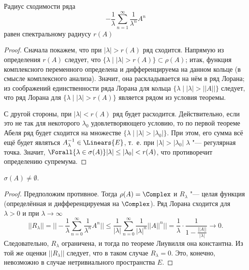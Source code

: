 \documentclass[main]{subfiles}
\begin{document}
\begin{proposition} %
  Радиус сходимости ряда 
  \[
    -\frac1\lambda \sum_{n=1}^\infty \frac1{\lambda^n} A^n
  \]
  равен спектральному радиусу \( r(A) \)
\end{proposition}
\begin{proof}
  Сначала покажем, что при \( |\lambda| > r(A) \)
  ряд сходится.
  Напрямую из определения \( r(A) \)
  следует, что
  \( \{ \lambda \mid |\lambda| > r(A) \} \subset \rho(A) \);
  итак, функция комплексного переменного определена
  и дифференцируема на данном кольце
  (в смысле комплексного анализа).
  Значит, она раскладывается на нём в ряд Лорана;
  из соображений единственности ряда Лорана
  для кольца \( \{ \lambda \mid |\lambda| > ||A|| \} \)
  следует, что ряд Лорана для
  \( \{ \lambda \mid |\lambda| > r(A) \} \)
  является рядом из условия
  теоремы.
 
  С другой стороны, при \( |\lambda| < r(A) \)
  ряд будет расходится.
  Действительно, если это не так для некоторого \( \lambda_0 \)
  удовлетворяющего условию, то
  по первой теореме Абеля
  ряд будет сходится на
  множестве
  \( \{ \lambda \mid |\lambda| > |\lambda_0| \} \).
  При этом, его сумма всё ещё будет
  являться \( A_\lambda^{-1} \in \Linears{E} \),
  т.~е. при \( |\lambda| > |\lambda_0| \)
  \( \lambda \) "--- регулярная точка.
  Значит, \( \Forall{\lambda \in \sigma(A)}
  |\lambda| \le |\lambda_0| < r(A) \),
  что противоречит определению супремума.
\end{proof}

\begin{proposition} %
  \( \sigma(A) \ne \emptyset \).
\end{proposition}
\begin{proof}
  Предположим противное.
  Тогда \( \rho(A) = \Complex \)
  и \( R_\lambda \) "--- целая функция
  (определённая и дифференцируемая на \( \Complex \)).
  Ряд Лорана сходится для \( \lambda > 0 \) и
  при \( \lambda \to \infty \)
  \[
    ||R_\lambda|| =
    ||-\frac{1}{\lambda} \sum_{n=0}^\infty \frac{1}{\lambda^n} A^n|| \le
    \frac{1}{|\lambda|} \sum_{n=0}^\infty \frac{1}{|\lambda|^n} ||A||^n|| =
    \frac{1}{\lambda} \cdot \frac{1}{1 - \frac{||A||}{|\lambda|}} \to 0.
  \]
  Следовательно, \( R_\lambda \) ограничена,
  и тогда по теореме Лиувилля
  она константна.
  Из той же оценки \( ||R_\lambda|| \) следует,
  что в таком случае \( R_\lambda = 0 \).
  Это, конечно, невозможно в случае нетривиального
  пространства \( E \).
\end{proof}
\end{document}
